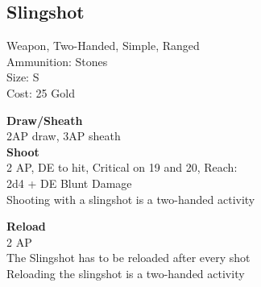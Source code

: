 \subsection{Slingshot}\label{weapon:slingshot}
Weapon, Two-Handed, Simple, Ranged\\
Ammunition: Stones\\
Size: S\\
Cost: 25 Gold

\textbf{Draw/Sheath}\\
2AP draw, 3AP sheath\\

\textbf{Shoot}\\
2 AP, DE to hit, Critical on 19 and 20,  Reach:\\
2d4 + \texttimes DE Blunt Damage\\
Shooting with a slingshot is a two-handed activity

\textbf{Reload}\\
2 AP\\
The Slingshot has to be reloaded after every shot\\
Reloading the slingshot is a two-handed activity

